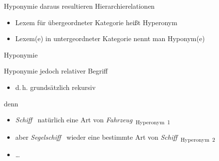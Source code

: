 \begin{frame}{Hyponymie}
\onslide<+->
daraus resultieren Hierarchierelationen
\Halbzeile
\begin{itemize}[<+->]
	\item		Lexem für übergeordneter Kategorie heißt Hyperonym
	\item		Lexem(e) in untergeordneter Kategorie nennt man Hyponym(e)
\end{itemize}
\onslide<+->
\Zeile
\begin{exe}
	\ex\label{ex:hyponymie-002}
    \begin{xlist}
		 \onslide<+->
		 \onslide<+->
	\end{xlist}
\end{exe}
\end{frame}

\begin{frame}{Hyponymie}
\onslide<+->
\center
\tikzset{level distance=75pt,sibling distance=25pt}
\end{frame}

\begin{frame}{Hyponymie}
\onslide<+->
jedoch relativer Begriff
\Halbzeile
\begin{itemize}[<+->]
	\item		d.\,h. grundsätzlich rekursiv
\end{itemize}
\onslide<+->
\Zeile
denn
\Halbzeile
\begin{itemize}[<+->]
	\item		\textit{Schiff}~\textsubscript{} natürlich eine Art von \textit{Fahrzeug}~\textsubscript{\alert{Hyperonym~1}}
	\item		aber \textit{Segelschiff}~\textsubscript{} wieder eine bestimmte Art von \textit{Schiff}~\textsubscript{\alert{Hyperonym~2}}
	\item		{\ldots}
\end{itemize}
\end{frame}

